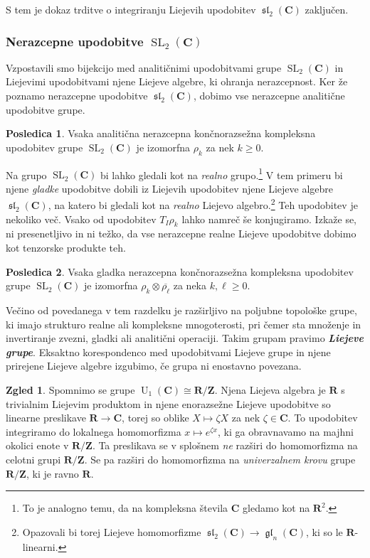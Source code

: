 \documentclass[11pt]{book}
\def\ZZ{\mathbf{Z}}
\def\RR{\mathbf{R}}
\def\CC{\mathbf{C}}
\DeclareMathOperator\glfrak{\mathfrak{gl}}
\DeclareMathOperator\slfrak{\mathfrak{sl}}
\DeclareMathOperator\U{U}
\DeclareMathOperator\SL{SL}
\def\definicija{\color{rdeca}\bf\em}
\theoremstyle{definition}
\theoremstyle{zgled}
\newtheorem*{zgled}{Zgled}
\theoremstyle{odprtproblem}
\theoremstyle{domacanaloga}
\theoremstyle{izrek}
\newtheorem*{posledica}{Posledica}
\begin{document}
S tem je dokaz trditve o integriranju Liejevih upodobitev $\slfrak_2(\CC)$ zaključen. 

\subsubsection{Nerazcepne upodobitve $\SL_2(\CC)$}

Vzpostavili smo bijekcijo med analitičnimi upodobitvami grupe $\SL_2(\CC)$ in Liejevimi upodobitvami njene Liejeve algebre, ki ohranja nerazcepnost. Ker že poznamo nerazcepne upodobitve $\slfrak_2(\CC)$, dobimo vse nerazcepne analitične upodobitve grupe.

\begin{posledica}
Vsaka analitična nerazcepna končnorazsežna kompleksna upodobitev grupe $\SL_2(\CC)$ je izomorfna $\rho_k$ za nek $k \geq 0$.
\end{posledica}

Na grupo $\SL_2(\CC)$ bi lahko gledali kot na \emph{realno} grupo.\footnote{To je analogno temu, da na kompleksna števila $\CC$ gledamo kot na $\RR^2$.} V tem primeru bi njene \emph{gladke} upodobitve dobili iz Liejevih upodobitev njene Liejeve algebre $\slfrak_2(\CC)$, na katero bi gledali kot na \emph{realno} Liejevo algebro.\footnote{Opazovali bi torej Liejeve homomorfizme $\slfrak_2(\CC) \to \glfrak_n(\CC)$, ki so le $\RR$-linearni.} Teh upodobitev je nekoliko več. Vsako od upodobitev $T_I \rho_k$ lahko namreč še konjugiramo. Izkaže se, ni presenetljivo in ni težko, da vse nerazcepne realne Liejeve upodobitve dobimo kot tenzorske produkte teh.

\begin{posledica}
Vsaka gladka nerazcepna končnorazsežna kompleksna upodobitev grupe $\SL_2(\CC)$ je izomorfna $\rho_k \otimes \overline{\rho_{\ell}}$ za neka $k, \ell \geq 0$.
\end{posledica}

Večino od povedanega v tem razdelku je razširljivo na poljubne topološke grupe, ki imajo strukturo realne ali kompleksne mnogoterosti, pri čemer sta množenje in invertiranje zvezni, gladki ali analitični operaciji. Takim grupam pravimo {\definicija Liejeve grupe}. Eksaktno korespondenco med upodobitvami Liejeve grupe in njene prirejene Liejeve algebre izgubimo, če grupa ni enostavno povezana. 

\begin{zgled}
Spomnimo se grupe $\U_1(\CC) \cong \RR/\ZZ$. Njena Liejeva algebra je $\RR$ s trivialnim Liejevim produktom in njene enorazsežne Liejeve upodobitve so linearne preslikave $\RR \to \CC$, torej so oblike $X \mapsto \zeta X$ za nek $\zeta \in \CC$. To upodobitev integriramo do lokalnega homomorfizma $x \mapsto e^{\zeta x}$, ki ga obravnavamo na majhni okolici enote v $\RR/\ZZ$. Ta preslikava se v splošnem \emph{ne} razširi do homomorfizma na celotni grupi $\RR/\ZZ$. Se pa razširi do homomorfizma na \emph{univerzalnem krovu} grupe $\RR/\ZZ$, ki je ravno $\RR$.
\end{zgled}
\end{document}
